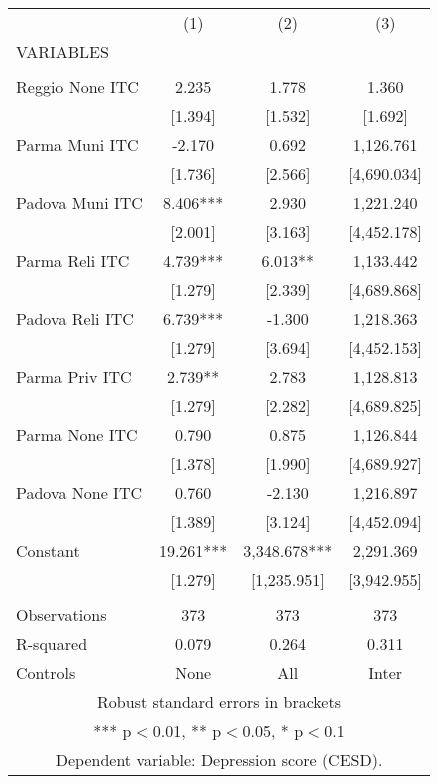 \begin{tabular}{lccc} \hline
 & (1) & (2) & (3) \\
VARIABLES &  &  &  \\ \hline
 &  &  &  \\
Reggio None ITC & 2.235 & 1.778 & 1.360 \\
 & [1.394] & [1.532] & [1.692] \\
Parma Muni ITC & -2.170 & 0.692 & 1,126.761 \\
 & [1.736] & [2.566] & [4,690.034] \\
Padova Muni ITC & 8.406*** & 2.930 & 1,221.240 \\
 & [2.001] & [3.163] & [4,452.178] \\
Parma Reli ITC & 4.739*** & 6.013** & 1,133.442 \\
 & [1.279] & [2.339] & [4,689.868] \\
Padova Reli ITC & 6.739*** & -1.300 & 1,218.363 \\
 & [1.279] & [3.694] & [4,452.153] \\
Parma Priv ITC & 2.739** & 2.783 & 1,128.813 \\
 & [1.279] & [2.282] & [4,689.825] \\
Parma None ITC & 0.790 & 0.875 & 1,126.844 \\
 & [1.378] & [1.990] & [4,689.927] \\
Padova None ITC & 0.760 & -2.130 & 1,216.897 \\
 & [1.389] & [3.124] & [4,452.094] \\
Constant & 19.261*** & 3,348.678*** & 2,291.369 \\
 & [1.279] & [1,235.951] & [3,942.955] \\
 &  &  &  \\
Observations & 373 & 373 & 373 \\
R-squared & 0.079 & 0.264 & 0.311 \\
 Controls & None & All & Inter \\ \hline
\multicolumn{4}{c}{ Robust standard errors in brackets} \\
\multicolumn{4}{c}{ *** p$<$0.01, ** p$<$0.05, * p$<$0.1} \\
\multicolumn{4}{c}{ Dependent variable: Depression score (CESD).} \\
\end{tabular}
